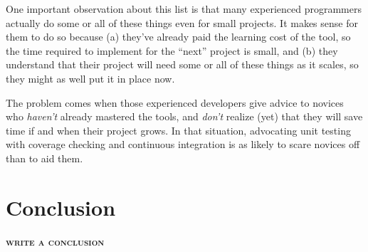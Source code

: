 \documentclass[10pt]{article}
\newcommand{\fixme}[1]{\textsc{\textbf{#1}}}
\begin{document}
One important observation about this list is that many experienced
programmers actually do some or all of these things even for small
projects. It makes sense for them to do so because (a) they've already
paid the learning cost of the tool, so the time required to implement
for the ``next'' project is small, and (b) they understand that their
project will need some or all of these things as it scales, so they
might as well put it in place now.

The problem comes when those experienced developers give advice to
novices who \emph{haven't} already mastered the tools, and \emph{don't}
realize (yet) that they will save time if and when their project grows.
In that situation, advocating unit testing with coverage checking and
continuous integration is as likely to scare novices off than to aid
them.

\section{Conclusion}\label{sec:conclusion}

\fixme{write a conclusion}


\end{document}
